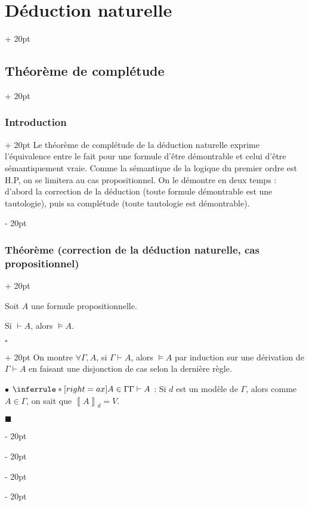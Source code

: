 \documentclass[a4paper, 12pt, twoside]{article}
\newcommand{\lrbb}[1]{\left\llbracket #1 \right\rrbracket}
\newcommand{\ind}[1][20pt]{\advance\leftskip + #1}
\newcommand{\deind}[1][20pt]{\advance\leftskip - #1}
\newenvironment{indt}[2][20pt]{#2 \par \ind[#1]}{\par \deind} %
\newenvironment{proof}[1][{}]{\begin{indt}{$\square$ #1}}{$\blacksquare$ \end{indt}}
\begin{document}
\begin{indt}{\section{Déduction naturelle}}
        \vspace{12pt}
        
        \begin{indt}{\subsection{Théorème de complétude}}
            \begin{indt}{\subsubsection{Introduction}}
                Le théorème de complétude de la déduction naturelle exprime l'équivalence entre le fait pour une formule d'être démontrable et celui d'être sémantiquement vraie.
                Comme la sémantique de la logique du premier ordre est H.P, on se limitera au cas propositionnel.
                On le démontre en deux temps : d'abord la correction de la déduction (toute formule démontrable est une tautologie), puis sa complétude (toute tautologie est démontrable).
            \end{indt}

            \vspace{12pt}
            
            \begin{indt}{\subsubsection{Théorème (correction de la déduction naturelle, cas propositionnel)}}
                \begin{emphBox}
                    Soit $A$ une formule propositionnelle.

                    Si $\vdash A$, alors $\vDash A$.
                \end{emphBox}

                \vspace{6pt}
                
                \begin{proof}
                    On montre $\forall \Gamma, A$, si $\Gamma \vdash A$, alors $\vDash A$ par induction sur une dérivation de $\Gamma \vdash A$ en faisant une disjonction de cas selon la dernière règle.

                    \vspace{6pt}
                    
                    $\bullet$ $\inferrule*[right=ax]{A \in \Gamma}{\Gamma \vdash A}$ :
                    Si $d$ est un modèle de $\Gamma$, alors comme $A \in \Gamma$, on sait que $\lrbb A _d = V$.


\end{proof}
\end{indt}
\end{indt}
\end{indt}
\end{document}
